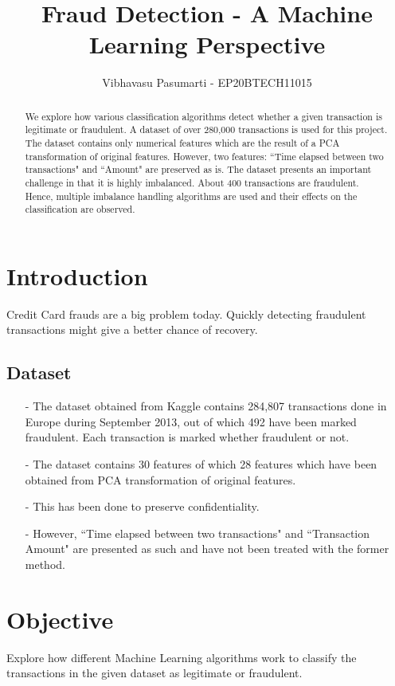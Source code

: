 \documentclass[12pt,a4paper]{article}
\title{Fraud Detection - A Machine Learning Perspective}
\author{Vibhavasu Pasumarti - EP20BTECH11015}
\begin{document}
\maketitle

\begin{abstract}
    We explore how various classification algorithms detect whether a given transaction is legitimate or fraudulent. A dataset of over 280,000 transactions is used for this project. The dataset contains only numerical features which are the result of a PCA transformation of original features. However, two features: ``Time elapsed between two transactions" and ``Amount" are preserved as is. The dataset presents an important challenge in that it is highly imbalanced. About 400 transactions are fraudulent. Hence, multiple imbalance handling algorithms are used and their effects on the classification are observed. 
\end{abstract}

\section{Introduction}\label{sec:intro}
Credit Card frauds are a big problem today. Quickly detecting fraudulent transactions might give a better chance of recovery.

\subsection*{Dataset}
\begin{itemize}
\item[-] The dataset obtained from Kaggle contains 284,807 transactions done in Europe during September 2013, out of which 492 have been marked fraudulent. Each transaction is marked whether fraudulent or not.
\item[-] The dataset contains 30 features of which 28 features which have been obtained from PCA transformation of original features.
\item[-] This has been done to preserve confidentiality.
\item[-] However, ``Time elapsed between two transactions" and ``Transaction Amount" are presented as such and have not been treated with the former method.
\end{itemize}

\section{Objective}
Explore how different Machine Learning algorithms work to classify the transactions in the given dataset as legitimate or fraudulent.\\
\end{document}
